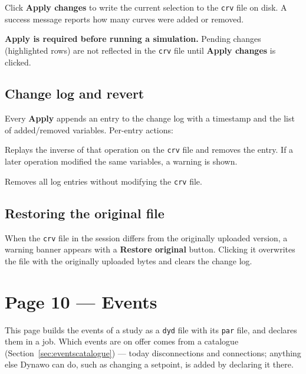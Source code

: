 \documentclass[a4paper,11pt]{article}
\newcommand{\ftype}[1]{\texttt{\small\color{rteblu}#1}}
\begin{document}
Click \textbf{Apply changes} to write the current selection to the \ftype{crv}
file on disk. A success message reports how many curves were added or removed.

\begin{warnbox}
\textbf{Apply is required before running a simulation.} Pending changes
(highlighted rows) are not reflected in the \ftype{crv} file until
\textbf{Apply changes} is clicked.
\end{warnbox}

\subsection{Change log and revert}

Every \textbf{Apply} appends an entry to the change log with a timestamp and
the list of added/removed variables. Per-entry actions:

\begin{description}[leftmargin=2em]
  \item[\textbf{Revert}] Replays the inverse of that operation on the
    \ftype{crv} file and removes the entry. If a later operation modified the
    same variables, a warning is shown.
  \item[\textbf{Clear all}] Removes all log entries without modifying the
    \ftype{crv} file.
\end{description}

\subsection{Restoring the original file}

When the \ftype{crv} file in the session differs from the originally uploaded
version, a warning banner appears with a \textbf{Restore original} button.
Clicking it overwrites the file with the originally uploaded bytes and clears
the change log.

\section{Page 10 --- Events}
\label{sec:events}

This page builds the events of a study as a \ftype{dyd} file with its
\ftype{par} file, and declares them in a job. Which events are on offer comes
from a catalogue (Section~\ref{sec:eventscatalogue}) --- today disconnections
and connections; anything else Dynawo can do, such as changing a setpoint, is
added by declaring it there.
\end{document}
